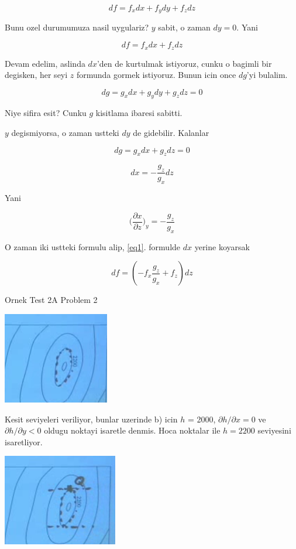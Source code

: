 \documentclass[12pt,fleqn]{article}
\begin{document}
\[ df = f_xdx + f_ydy + f_zdz \]  

Bunu ozel durumumuza nasil uygulariz? $y$ sabit, o zaman $dy = 0$. Yani

\begin{equation}\label{eq1}
df = f_xdx + f_zdz  
\end{equation}

Devam edelim, aslinda $dx$'den de kurtulmak istiyoruz, cunku o bagimli bir
degisken, her seyi $z$ formunda gormek istiyoruz. Bunun icin once $dg$'yi
bulalim. 

\[ dg = g_xdx + g_ydy + g_zdz = 0   \]

Niye sifira esit? Cunku $g$ kisitlama ibaresi sabitti. 

$y$ degismiyorsa, o zaman ustteki $dy$ de gidebilir. Kalanlar

\[ dg = g_xdx + g_zdz = 0  \]

\[ dx = -\frac{g_z}{g_x}dz \]

Yani 

\[ 
\bigg( \frac{\partial x}{\partial z}\bigg)_{y} = -\frac{g_z}{g_x}
 \]

O zaman iki ustteki formulu alip, \ref{eq1}. formulde $dx$ yerine 
koyarsak

\[ df = (-f_x\frac{g_z}{g_x} +  f_z) dz \]

Ornek Test 2A Problem 2

\includegraphics[height=4cm]{15_2.png}

Kesit seviyeleri veriliyor, bunlar uzerinde b) icin $h$ = 2000, 
$\partial
h/\partial x = 0$ ve $\partial h/\partial y < 0$ oldugu noktayi isaretle denmis. Hoca 
noktalar ile $h=2200$ seviyesini isaretliyor. 

\includegraphics[height=4cm]{15_3.png}
\end{document}
